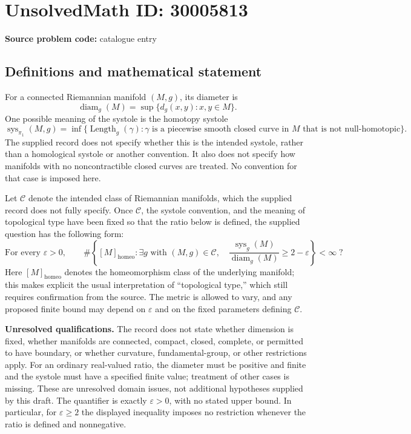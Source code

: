\documentclass[11pt]{article}
\begin{document}
\section*{UnsolvedMath ID: 30005813}
\textbf{Source problem code:} catalogue entry
\subsection{Definitions and mathematical statement}
For a connected Riemannian manifold $(M,g)$, its diameter is
\[
\operatorname{diam}_g(M)=\sup\{d_g(x,y):x,y\in M\}.
\]
One possible meaning of the systole is the homotopy systole
\[
\operatorname{sys}_{\pi_1}(M,g)=\inf\{\operatorname{Length}_g(\gamma):\gamma\text{ is a piecewise smooth closed curve in }M\text{ that is not null-homotopic}\}.
\]
The supplied record does not specify whether this is the intended systole, rather than a homological systole or another convention. It also does not specify how manifolds with no noncontractible closed curves are treated. No convention for that case is imposed here.

Let $\mathcal C$ denote the intended class of Riemannian manifolds, which the supplied record does not fully specify. Once $\mathcal C$, the systole convention, and the meaning of topological type have been fixed so that the ratio below is defined, the supplied question has the following form:
\[
\text{For every }\varepsilon>0,\qquad
\#\left\{[M]_{\mathrm{homeo}}:\exists g\text{ with }(M,g)\in\mathcal C,\quad
\frac{\operatorname{sys}_g(M)}{\operatorname{diam}_g(M)}\geq 2-\varepsilon\right\}<\infty\;?
\]
Here $[M]_{\mathrm{homeo}}$ denotes the homeomorphism class of the underlying manifold; this makes explicit the usual interpretation of ``topological type,'' which still requires confirmation from the source. The metric is allowed to vary, and any proposed finite bound may depend on $\varepsilon$ and on the fixed parameters defining $\mathcal C$.

\textbf{Unresolved qualifications.} The record does not state whether dimension is fixed, whether manifolds are connected, compact, closed, complete, or permitted to have boundary, or whether curvature, fundamental-group, or other restrictions apply. For an ordinary real-valued ratio, the diameter must be positive and finite and the systole must have a specified finite value; treatment of other cases is missing. These are unresolved domain issues, not additional hypotheses supplied by this draft. The quantifier is exactly $\varepsilon>0$, with no stated upper bound. In particular, for $\varepsilon\geq2$ the displayed inequality imposes no restriction whenever the ratio is defined and nonnegative.
\end{document}
